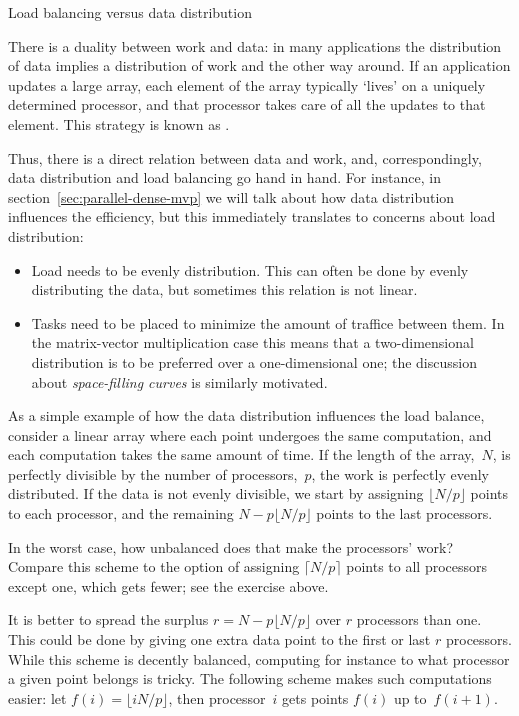  {Load balancing versus data distribution}

There is a duality between work and data: in many applications
the distribution of data implies a distribution of work and
the other way around. If an application updates a large array,
each element of the array typically `lives' on a uniquely determined
processor, and that processor takes care of all the updates to that
element. This strategy is known as .

Thus, there is a direct relation between data and work,
and, correspondingly, data distribution and load balancing go hand in hand.
For instance, in section~\ref{sec:parallel-dense-mvp} we will talk about
how data distribution influences the efficiency, but this immediately translates
to concerns about load distribution:
\begin{itemize}
\item Load needs to be evenly distribution. This can often be done by
  evenly distributing the data, but sometimes this relation is not linear.
\item Tasks need to be placed to minimize the amount of traffice between them.
  In the matrix-vector multiplication case this means that a two-dimensional distribution
  is to be preferred over a one-dimensional one; the discussion about
  \emph{space-filling curves} is similarly motivated.
\end{itemize}

As a simple example of how the data distribution influences the load
balance, consider a linear array where each point undergoes the same
computation, and each computation takes the same amount of time.
If the length of the array,~$N$, is perfectly divisible by the number
of processors,~$p$, the work is perfectly evenly distributed.
If the data is not evenly divisible, we start by assigning $\lfloor N/p\rfloor$
points to each processor, and the remaining $N-p\lfloor N/p\rfloor$
points to the last processors.

\begin{exercise}
In the worst case, how unbalanced does that make the processors' work?
Compare this scheme to the option of assigning $\lceil N/p\rceil$
points to all processors except one, which gets fewer; see the exercise above.
\end{exercise}

It is better to spread the surplus $r=N-p\lfloor N/p\rfloor$
over $r$ processors than one. This could be done by giving one extra
data point to the first or last $r$ processors. While this scheme
is decently balanced, computing for instance to what processor
a given point belongs is tricky. The following scheme makes
such computations easier: let $f(i)=\lfloor iN/p\rfloor$, then processor~$i$
gets points $f(i)$ up to~$f(i+1)$.

